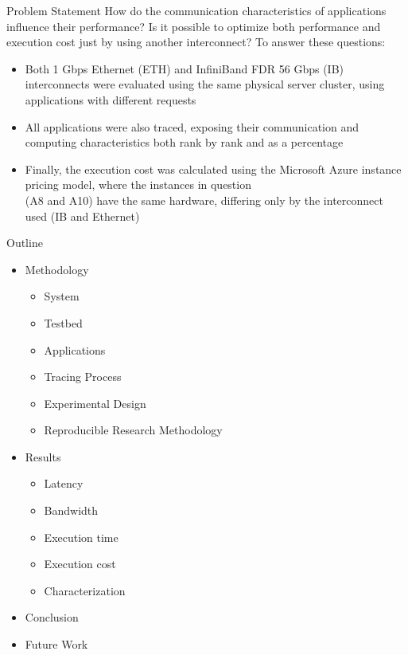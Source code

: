 \documentclass{beamer}
\begin{document}
\begin{frame}{Problem Statement}
How do the \alert{communication characteristics} of applications influence their \alert{performance}?
\pause \vfill
Is it possible to optimize both \alert{performance} and \alert{execution cost} just by using another interconnect?
\pause \vfill
To answer these questions:

\pause \vfill
\begin{itemize}
    \item Both 1 Gbps Ethernet (ETH) and InfiniBand FDR 56 Gbps (IB) interconnects were evaluated using the same physical server cluster, using applications with different requests
\pause \vfill
    \item All applications were also traced, exposing their communication and computing characteristics both rank by rank and as a percentage
\pause \vfill
    \item Finally, the execution cost was calculated using the Microsoft Azure instance pricing model, where the instances in question \\(A8 and A10) have the same hardware, differing only by the interconnect used (IB and Ethernet)
\end{itemize}
\vfill
    
\end{frame}
\begin{frame}{Outline}
\vfill
\Large
\begin{itemize}
\item Methodology
\begin{itemize}
\item System
\item Testbed
\item Applications
\item Tracing Process
\item Experimental Design
\item Reproducible Research Methodology
\end{itemize}
\end{itemize}
\begin{itemize}
\item Results
\begin{itemize}
    \item Latency
    \item Bandwidth
    \item Execution time
    \item Execution cost
    \item Characterization
\end{itemize}
\end{itemize}
\begin{itemize}
\item Conclusion
\item Future Work
\end{itemize}
\end{frame}
\end{document}
